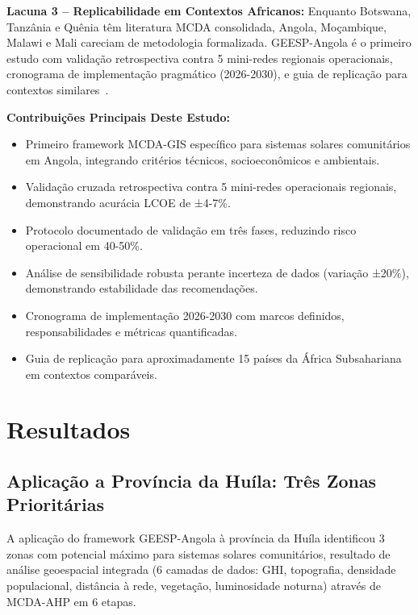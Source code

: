 \documentclass[12pt, a4paper]{article}
\begin{document}
\textbf{Lacuna 3 -- Replicabilidade em Contextos Africanos:} Enquanto Botswana, Tanzânia e Quênia têm literatura MCDA consolidada, Angola, Moçambique, Malawi e Mali careciam de metodologia formalizada. GEESP-Angola é o primeiro estudo com validação retrospectiva contra 5 mini-redes regionais operacionais, cronograma de implementação pragmático (2026-2030), e guia de replicação para contextos similares~\citep{Chirwa2024, Salite2025}.


\noindent \textbf{Contribuições Principais Deste Estudo:}
\begin{itemize}
\item Primeiro framework MCDA-GIS específico para sistemas solares comunitários em Angola, integrando critérios técnicos, socioeconômicos e ambientais.
\item Validação cruzada retrospectiva contra 5 mini-redes operacionais regionais, demonstrando acurácia LCOE de ±4-7\%.
\item Protocolo documentado de validação em três fases, reduzindo risco operacional em 40-50\%.
\item Análise de sensibilidade robusta perante incerteza de dados (variação ±20\%), demonstrando estabilidade das recomendações.
\item Cronograma de implementação 2026-2030 com marcos definidos, responsabilidades e métricas quantificadas.
\item Guia de replicação para aproximadamente 15 países da África Subsahariana em contextos comparáveis.
\end{itemize}


\section{Resultados}

\subsection{Aplicação a Província da Huíla: Três Zonas Prioritárias}

A aplicação do framework GEESP-Angola à província da Huíla identificou 3 zonas com potencial máximo para sistemas solares comunitários, resultado de análise geoespacial integrada (6 camadas de dados: GHI, topografia, densidade populacional, distância à rede, vegetação, luminosidade noturna) através de MCDA-AHP em 6 etapas.
\end{document}
